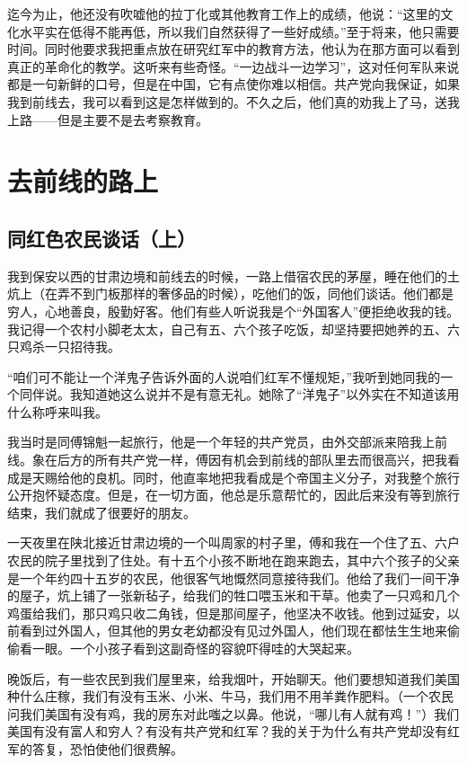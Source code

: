 \documentclass[10pt]{book}
\begin{document}
迄今为止，他还没有吹嘘他的拉丁化或其他教育工作上的成绩，他说：“这里的文化水平实在低得不能再低，所以我们自然获得了一些好成绩。”至于将来，他只需要时间。同时他要求我把重点放在研究红军中的教育方法，他认为在那方面可以看到真正的革命化的教学。这听来有些奇怪。“一边战斗一边学习”，这对任何军队来说都是一句新鲜的口号，但是在中国，它有点使你难以相信。共产党向我保证，如果我到前线去，我可以看到这是怎样做到的。不久之后，他们真的劝我上了马，送我上路——但是主要不是去考察教育。

\chapter{去前线的路上}

\section{同红色农民谈话（上）}

我到保安以西的甘肃边境和前线去的时候，一路上借宿农民的茅屋，睡在他们的土炕上（在弄不到门板那样的奢侈品的时候），吃他们的饭，同他们谈话。他们都是穷人，心地善良，殷勤好客。他们有些人听说我是个“外国客人”便拒绝收我的钱。我记得一个农村小脚老太太，自己有五、六个孩子吃饭，却坚持要把她养的五、六只鸡杀一只招待我。

“咱们可不能让一个洋鬼子告诉外面的人说咱们红军不懂规矩，”我听到她同我的一个同伴说。我知道她这么说并不是有意无礼。她除了“洋鬼子”以外实在不知道该用什么称呼来叫我。

我当时是同傅锦魁一起旅行，他是一个年轻的共产党员，由外交部派来陪我上前线。象在后方的所有共产党一样，傅因有机会到前线的部队里去而很高兴，把我看成是天赐给他的良机。同时，他直率地把我看成是个帝国主义分子，对我整个旅行公开抱怀疑态度。但是，在一切方面，他总是乐意帮忙的，因此后来没有等到旅行结束，我们就成了很要好的朋友。

一天夜里在陕北接近甘肃边境的一个叫周家的村子里，傅和我在一个住了五、六户农民的院子里找到了住处。有十五个小孩不断地在跑来跑去，其中六个孩子的父亲是一个年约四十五岁的农民，他很客气地慨然同意接待我们。他给了我们一间干净的屋子，炕上铺了一张新毡子，给我们的牲口喂玉米和干草。他卖了一只鸡和几个鸡蛋给我们，那只鸡只收二角钱，但是那间屋子，他坚决不收钱。他到过延安，以前看到过外国人，但其他的男女老幼都没有见过外国人，他们现在都怯生生地来偷偷看一眼。一个小孩子看到这副奇怪的容貌吓得哇的大哭起来。

晚饭后，有一些农民到我们屋里来，给我烟叶，开始聊天。他们要想知道我们美国种什么庄稼，我们有没有玉米、小米、牛马，我们用不用羊粪作肥料。（一个农民问我们美国有没有鸡，我的房东对此嗤之以鼻。他说，“哪儿有人就有鸡！”）我们美国有没有富人和穷人？有没有共产党和红军？我的关于为什么有共产党却没有红军的答复，恐怕使他们很费解。
\end{document}
